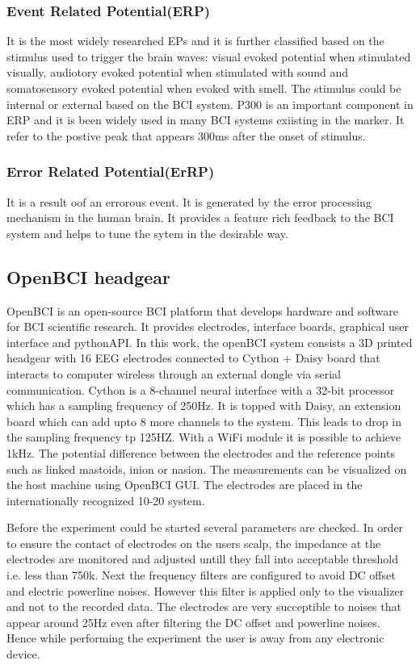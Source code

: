     \subsubsection{Event Related Potential(ERP)}
It is the most widely researched EPs and it is further classified based on the stimulus used to trigger the brain waves: visual evoked potential when stimulated visually,
audiotory evoked potential when stimulated with sound and somatosensory evoked potential when evoked with smell. The stimulus could be internal or external based on the BCI 
system. P300 is an important component in ERP and it is been widely used in many BCI systems exiisting in the marker. It refer to the postive peak that appears 300ms after the 
onset of stimulus.

    \subsubsection{Error Related Potential(ErRP)}
It is a result oof an errorous event. It is generated by the error processing mechanism in the human brain. It provides a feature rich feedback to the BCI system and helps to
tune the sytem in the desirable way.

\subsection{OpenBCI headgear}
    OpenBCI is an open-source BCI platform that develops hardware and software for BCI scientific research. It provides electrodes, interface boards, graphical user interface 
and pythonAPI. In this work, the openBCI system consists a 3D printed headgear with 16 EEG electrodes connected to Cython + Daisy board that interacts to computer wireless 
through an external dongle via 
serial communication. Cython is a 8-channel neural interface with a 32-bit processor which has a sampling frequency of 250Hz. It is topped with Daisy, an extension board which 
can add upto 8 more channels to the system. This leads to drop in the sampling frequency tp 125HZ. With a WiFi module it is possible to achieve 1kHz.
The potential difference between the electrodes and the reference points such as 
linked mastoids, inion or nasion. The measurements can be visualized on the host machine using OpenBCI GUI. The electrodes are placed in the internationally recognized 10-20 system.

    Before the experiment could be started several parameters are checked. In order to ensure the contact of electrodes on the users scalp, the impedance at the electrodes are
monitored and adjusted untill they fall into acceptable threshold i.e. less than 750k\Omega. Next the frequency filters are configured to avoid DC offset and electric powerline 
noises. However this filter is applied only to the visualizer and not to the recorded data. The electrodes are very succeptible to noises that appear around 25Hz even after
filtering the DC offset and powerline noises. Hence while performing the experiment the user is away from any electronic device.

